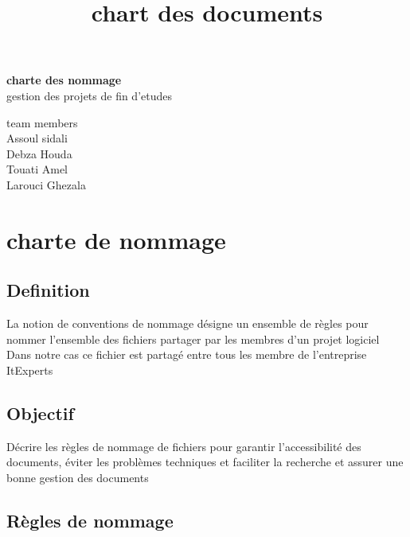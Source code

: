 \documentclass[11pt,fleqn]{book} %
\begin{document}
\title{chart des documents}
\begingroup
\thispagestyle{empty}
\centering
\vspace*{5cm}
\par\normalfont\fontsize{35}{35}\sffamily\selectfont
\textbf{charte des nommage}\\
{\LARGE gestion des projets de fin d'etudes}\par %
\vspace*{2cm}
\raggedright
{\Huge team members \\}
\vspace*{0.5cm}
{\huge 
Assoul sidali \\
Debza Houda\\
Touati Amel\\
Larouci Ghezala\\}\par %
\endgroup


\pagestyle{empty} %

\tableofcontents %


\pagestyle{fancy} %
\chapter{charte de nommage}
\section{Definition}
La notion de conventions de nommage désigne un ensemble de règles pour nommer l’ensemble des fichiers partager par les membres d’un projet logiciel Dans notre cas ce fichier est partagé entre tous les membre de l’entreprise ItExperts
\section{Objectif}
Décrire les règles de nommage de fichiers pour garantir l'accessibilité des documents, éviter les problèmes techniques et faciliter la recherche et assurer une bonne gestion des documents
\section{Règles de nommage}
\end{document}
